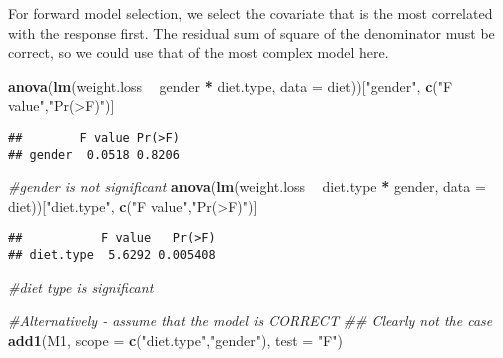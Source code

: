 \documentclass[]{book}
\newenvironment{Shaded}{\begin{snugshade}}{\end{snugshade}}
\newcommand{\CommentTok}[1]{\textcolor[rgb]{0.56,0.35,0.01}{\textit{#1}}}
\newcommand{\DataTypeTok}[1]{\textcolor[rgb]{0.13,0.29,0.53}{#1}}
\newcommand{\DecValTok}[1]{\textcolor[rgb]{0.00,0.00,0.81}{#1}}
\newcommand{\KeywordTok}[1]{\textcolor[rgb]{0.13,0.29,0.53}{\textbf{#1}}}
\newcommand{\NormalTok}[1]{#1}
\newcommand{\OperatorTok}[1]{\textcolor[rgb]{0.81,0.36,0.00}{\textbf{#1}}}
\newcommand{\StringTok}[1]{\textcolor[rgb]{0.31,0.60,0.02}{#1}}
\theoremstyle{definition}
\theoremstyle{definition}
\theoremstyle{definition}
\theoremstyle{remark}
\begin{document}
\begin{Shaded}
\end{Shaded}

For forward model selection, we select the covariate that is the most correlated with the response first. The residual sum of square of the denominator must be correct, so we could use that of the most complex model here.

\begin{Shaded}
\begin{Highlighting}[]
\KeywordTok{anova}\NormalTok{(}\KeywordTok{lm}\NormalTok{(weight.loss }\OperatorTok{~}\StringTok{ }\NormalTok{gender }\OperatorTok{*}\StringTok{ }\NormalTok{diet.type, }\DataTypeTok{data =}\NormalTok{ diet))[}\StringTok{"gender"}\NormalTok{, }\KeywordTok{c}\NormalTok{(}\StringTok{"F value"}\NormalTok{,}\StringTok{"Pr(>F)"}\NormalTok{)] }
\end{Highlighting}
\end{Shaded}

\begin{verbatim}
##        F value Pr(>F)
## gender  0.0518 0.8206
\end{verbatim}

\begin{Shaded}
\begin{Highlighting}[]
\CommentTok{#gender is not significant}
\KeywordTok{anova}\NormalTok{(}\KeywordTok{lm}\NormalTok{(weight.loss }\OperatorTok{~}\StringTok{ }\NormalTok{diet.type }\OperatorTok{*}\StringTok{ }\NormalTok{gender, }\DataTypeTok{data =}\NormalTok{ diet))[}\StringTok{"diet.type"}\NormalTok{, }\KeywordTok{c}\NormalTok{(}\StringTok{"F value"}\NormalTok{,}\StringTok{"Pr(>F)"}\NormalTok{)] }
\end{Highlighting}
\end{Shaded}

\begin{verbatim}
##           F value   Pr(>F)
## diet.type  5.6292 0.005408
\end{verbatim}

\begin{Shaded}
\begin{Highlighting}[]
\CommentTok{#diet type is significant}

\CommentTok{#Alternatively - assume that the model is CORRECT}
\CommentTok{## Clearly not the case}
\KeywordTok{add1}\NormalTok{(M1, }\DataTypeTok{scope =} \KeywordTok{c}\NormalTok{(}\StringTok{"diet.type"}\NormalTok{,}\StringTok{"gender"}\NormalTok{), }\DataTypeTok{test =} \StringTok{"F"}\NormalTok{)}
\end{Highlighting}
\end{Shaded}
\end{document}
